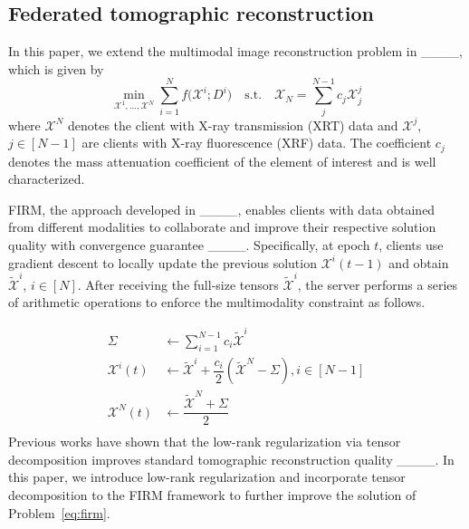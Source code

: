 \subsection{Federated tomographic reconstruction}
In this paper, we extend the multimodal image reconstruction problem in ____, which is given by
\begin{equation}\label{eq:firm}
    \min_{\boldsymbol{\mathcal{X}}^1, ..., \boldsymbol{\mathcal{X}}^N} \sum_{i=1}^N f\big(\boldsymbol{\mathcal{X}}^i; \mathit{D}^i\big) \quad
    \text{s.t.} \quad \boldsymbol{\mathcal{X}}_{N} = \sum_j^{N-1} c_j \boldsymbol{\mathcal{X}}^j_{j}
\end{equation}
where $\boldsymbol{\mathcal{X}}^N$ denotes the client with X-ray transmission (XRT) data and $\boldsymbol{\mathcal{X}}^j$, $j\in[N-1]$ are clients with X-ray fluorescence (XRF) data. The coefficient $c_j$ denotes the mass attenuation coefficient of the element of interest and is well characterized.

FIRM, the approach developed in ____, enables clients with data obtained from different modalities to collaborate and improve their respective solution quality with convergence guarantee ____. Specifically, at epoch $t$, clients use gradient descent to locally update the previous solution $\boldsymbol{\mathcal{X}}^i(t-1)$ and obtain $\tilde{\boldsymbol{\mathcal{X}}}^i$, $i\in[N]$. After receiving the full-size tensors $\tilde{\boldsymbol{\mathcal{X}}}^i$, the server performs a series of arithmetic operations to enforce the multimodality constraint as follows.

\begin{equation}\label{eq:firm_update}
\begin{aligned}
    \Sigma &\leftarrow \sum_{i=1}^{N-1} c_i\tilde{\boldsymbol{\mathcal{X}}}^i\\
    \boldsymbol{\mathcal{X}}^i(t) &\leftarrow \tilde{\boldsymbol{\mathcal{X}}}^i + \dfrac{c_i}{2}(\tilde{\boldsymbol{\mathcal{X}}}^N - \Sigma), i\in[N-1]\\ 
    \boldsymbol{\mathcal{X}}^N(t) &\leftarrow \dfrac{\tilde{\boldsymbol{\mathcal{X}}}^N + \Sigma}{2}\\
\end{aligned}
\end{equation}
Previous works have shown that the low-rank regularization via tensor decomposition improves standard tomographic reconstruction quality ____. In this paper, we introduce low-rank regularization and incorporate tensor decomposition to the FIRM framework to further improve the solution of Problem~\ref{eq:firm}.